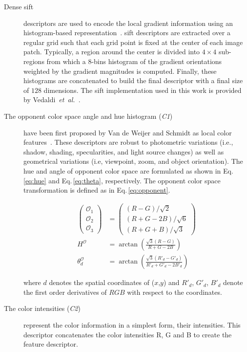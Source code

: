 \begin{description}
\item[Dense \acf{sift}] descriptors are used to encode the local gradient information using an histogram-based representation~\cite{lowe1999object}. 
\ac{sift} descriptors are extracted over a regular grid such that each grid point is fixed at the center of each image patch.
Typically, a region around the center is divided into $4 \times 4$ sub-regions from which a $8$-bins histogram of the gradient orientations weighted by the gradient magnitudes is computed.
Finally, these histograms are concatenated to build the final descriptor with a final size of $128$ dimensions.
The \ac{sift} implementation used in this work is provided by Vedaldi~\emph{et~al.}~\cite{vedaldi2010vlfeat}.

\item[The opponent color space angle and hue histogram (\emph{C1})] have been first proposed by Van de Weijer and Schmidt as local color features~\cite{van2006coloring}.
These descriptors are robust to photometric variations (i.e., shadow, shading, specularities, and light source changes) as well as geometrical variations (i.e, viewpoint, zoom, and object orientation).
The hue and angle of opponent color space are formulated as shown in Eq.\,\ref{eq:hue} and Eq.\,\ref{eq:theta}, respectively.
The opponent color space transformation is defined as in Eq.\,\ref{eq:opponent}.

\begin{align}
    \begin{pmatrix}
      \mathcal{O}_{1}\\\mathcal{O}_{2} \\\mathcal{O}_{3}
    \end{pmatrix} & =
                    \begin{pmatrix}
                      (R-G)/\sqrt{2}\\
                      (R+G-2B)/\sqrt{6}\\
                      (R+G+B)/\sqrt{3}
                    \end{pmatrix} \label{eq:opponent}\\
    H^{\mathcal{O}} & = \arctan\left(\frac{\sqrt{3}(R-G)}{R+G-2B}\right)\label{eq:hue}\\
    \theta_{d}^{\mathcal{O}} & = \arctan\left(\frac{\sqrt{3}(R'_{d}-G'_{d})}{R'_{d}+G'_{d}-2B'_{d}}\right)\label{eq:theta}
  \end{align}

\noindent where $d$ denotes the spatial coordinates of ($x$,$y$) and $R'_{d}$, $G'_{d}$, $B'_{d}$ denote the first order derivatives of $RGB$ with respect to the coordinates.

\item[The color intensities (\emph{C2})] represent the color information in a simplest form, their intensities.
This descriptor concatenates the color intensities R, G and B to create the feature descriptor.
\end{description}

